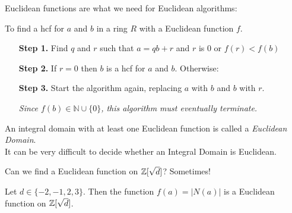 \documentclass[twoside]{scrartcl}
\begin{document}
Euclidean functions are what we need for Euclidean algorithms: \vspace*{5pt}\\
\begin{algorithm}To find a hcf for $a$ and $b$ in a ring $R$ with a Euclidean function $f$.\begin{itemize}
\item[\textbf{Step 1.}] Find $q$ and $r$ such that $a = qb + r$ and $r$ is $0$ or $f(r) < f(b)$
\item[\textbf{Step 2.}]	If $r = 0$ then $b$ is a hcf for $a$ and $b$. Otherwise:
\item[\textbf{Step 3.}] Start the algorithm again, replacing $a$ with $b$ and $b$ with $r$.

\textit{Since $f(b) \in \mathbb{N}\cup \{0\}$, this algorithm must eventually terminate.}
\end{itemize}
\end{algorithm}\vspace*{10pt}

\begin{definition} An integral domain with at least one Euclidean function is called a \emph{Euclidean Domain}.\vspace*{5pt}\\
It can be very difficult to decide whether an Integral Domain is Euclidean.
\end{definition}\vspace*{10pt}

Can we find a Euclidean function on $\mathbb{Z}[\sqrt{d}]$? Sometimes!\\

\begin{proposition} Let $d \in \{-2,-1,2,3\}.$ Then the function $f(a) = |N(a)|$ is a Euclidean function on $\mathbb{Z}[\sqrt{d}]$.	
\end{proposition}
\end{document}
